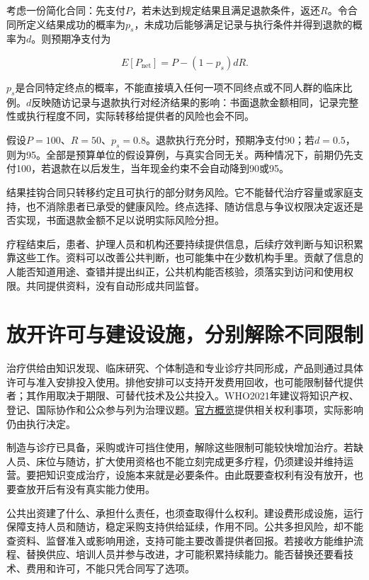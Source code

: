 \documentclass[UTF8,fontset=windows,12pt,a4paper,oneside,openany]{ctexbook}
\begin{document}
考虑一份简化合同：先支付\(P\)，若未达到规定结果且满足退款条件，返还\(R\)。令合同所定义结果成功的概率为\(p_s\)，未成功后能够满足记录与执行条件并得到退款的概率为\(d\)。则预期净支付为

\[
E[P_{\mathrm{net}}]=P-(1-p_s)dR.
\tag{11-5}
\]

\(p_s\)是合同特定终点的概率，不能直接填入任何一项不同终点或不同人群的临床比例。\(d\)反映随访记录与退款执行对经济结果的影响：书面退款金额相同，记录完整性或执行程度不同，实际转移给提供者的风险也会不同。

假设\(P=100\)、\(R=50\)、\(p_s=0.8\)。退款执行充分时，预期净支付90；若\(d=0.5\)，则为95。全部是预算单位的假设算例，与真实合同无关。两种情况下，前期仍先支付100，若退款在以后发生，当年现金约束不会自动降到90或95。

结果挂钩合同只转移约定且可执行的部分财务风险。它不能替代治疗容量或家庭支持，也不消除患者已承受的健康风险。终点选择、随访信息与争议权限决定返还是否实现，书面退款金额不足以说明实际风险分担。

疗程结束后，患者、护理人员和机构还要持续提供信息，后续疗效判断与知识积累靠这些工作。资料可以改善公共判断，也可能集中在少数机构手里。贡献了信息的人能否知道用途、查错并提出纠正，公共机构能否核验，须落实到访问和使用权限。共同提供资料，没有自动形成共同监督。

\section{放开许可与建设设施，分别解除不同限制}

治疗供给由知识发现、临床研究、个体制造和专业诊疗共同形成，产品则通过具体许可与准入安排投入使用。排他安排可以支持开发费用回收，也可能限制替代提供者；其作用取决于期限、可替代技术及公共投入。WHO2021年建议将知识产权、登记、国际协作和公众参与列为治理议题。\href{https://www.who.int/publications/i/item/9789240030381}{官方概览}提供相关权利事项，实际影响仍由执行决定。

制造与诊疗已具备，采购或许可挡住使用，解除这些限制可能较快增加治疗。若缺人员、床位与随访，扩大使用资格也不能立刻完成更多疗程，仍须建设并维持运营。要把知识变成治疗，设施本来就是必要条件。由此既要查权利有没有放开，也要查放开后有没有真实能力使用。

公共出资建了什么、承担什么责任，也须查取得什么权利。建设费形成设施，运行保障支持人员和随访，稳定采购支持供给延续，作用不同。公共多担风险，却不能查资料、监督准入或影响用途，支持可能主要改善提供者回报。若接收方能维护流程、替换供应、培训人员并参与改进，才可能积累持续能力。能否替换还要看技术、费用和许可，不能只凭合同写了选项。
\end{document}
